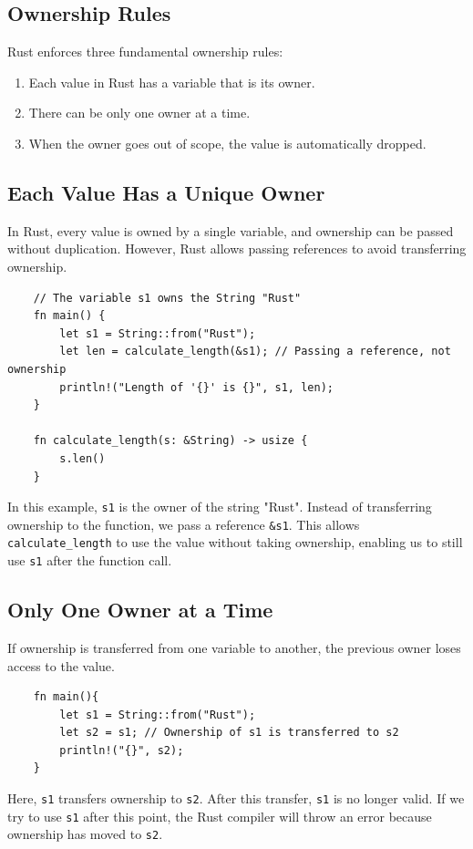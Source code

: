 \documentclass[a4paper,12pt]{report}
\begin{document}
\subsection*{Ownership Rules}
Rust enforces three fundamental ownership rules:
\begin{enumerate}
	\item Each value in Rust has a variable that is its owner.
	\item There can be only one owner at a time.
	\item When the owner goes out of scope, the value is automatically dropped.
\end{enumerate}

\subsection*{Each Value Has a Unique Owner}
In Rust, every value is owned by a single variable, and ownership can be passed without duplication. However, Rust allows passing references to avoid transferring ownership. 

\begin{lstlisting}
	// The variable s1 owns the String "Rust"
	fn main() {
		let s1 = String::from("Rust"); 
		let len = calculate_length(&s1); // Passing a reference, not ownership
		println!("Length of '{}' is {}", s1, len);
	}
	
	fn calculate_length(s: &String) -> usize { 
		s.len()
	}
\end{lstlisting}

	\noindent In this example, \texttt{s1} is the owner of the string "Rust". Instead of transferring ownership to the function, we pass a reference \texttt{\&s1}. This allows \texttt{calculate\_length} to use the value without taking ownership, enabling us to still use \texttt{s1} after the function call.

\subsection*{Only One Owner at a Time}
If ownership is transferred from one variable to another, the previous owner loses access to the value.

\begin{lstlisting}
	fn main(){
		let s1 = String::from("Rust");
		let s2 = s1; // Ownership of s1 is transferred to s2
		println!("{}", s2);
	}
\end{lstlisting}

	\noindent Here, \texttt{s1} transfers ownership to \texttt{s2}. After this transfer, \texttt{s1} is no longer valid. If we try to use \texttt{s1} after this point, the Rust compiler will throw an error because ownership has moved to \texttt{s2}.
\end{document}

